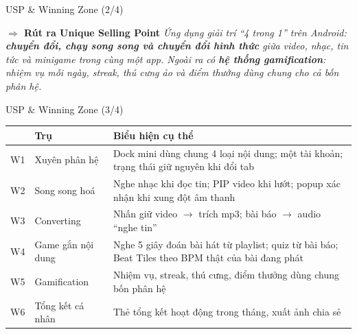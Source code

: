 \documentclass[aspectratio=169]{beamer}
\begin{document}
\begin{frame}{USP \& Winning Zone (2/4)}
\begin{center}
  \end{center}
  \vfill
  \begin{block}{\small\bfseries $\Rightarrow$ Rút ra Unique Selling Point}
    \small\itshape Ứng dụng giải trí ``4 trong 1'' trên Android: \textbf{chuyển đổi, chạy song song và chuyển đổi hình thức} giữa video, nhạc, tin tức và minigame trong cùng một app. Ngoài ra có \textbf{hệ thống gamification}: nhiệm vụ mỗi ngày, streak, thú cưng ảo và điểm thưởng dùng chung cho cả bốn phân hệ.
  \end{block}
\end{frame}

\begin{frame}{USP \& Winning Zone (3/4)}
  \small
  \begin{tabular}{@{}p{0.5cm}p{3.4cm}p{8.2cm}@{}}
    \toprule
    \textbf{} & \textbf{Trụ} & \textbf{Biểu hiện cụ thể} \\
    \midrule
    W1 & Xuyên phân hệ & Dock mini dùng chung 4 loại nội dung; một tài khoản; trạng thái giữ nguyên khi đổi tab \\
    W2 & Song song hoá & Nghe nhạc khi đọc tin; PIP video khi lướt; popup xác nhận khi xung đột âm thanh \\
    W3 & Converting & Nhấn giữ video $\rightarrow$ trích mp3; bài báo $\rightarrow$ audio ``nghe tin'' \\
    W4 & Game gắn nội dung & Nghe 5 giây đoán bài hát từ playlist; quiz từ bài báo; Beat Tiles theo BPM thật của bài đang phát \\
    W5 & Gamification & Nhiệm vụ, streak, thú cưng, điểm thưởng dùng chung bốn phân hệ \\
    W6 & Tổng kết cá nhân & Thẻ tổng kết hoạt động trong tháng, xuất ảnh chia sẻ \\
    \bottomrule
  \end{tabular}
\end{frame}
\end{document}
